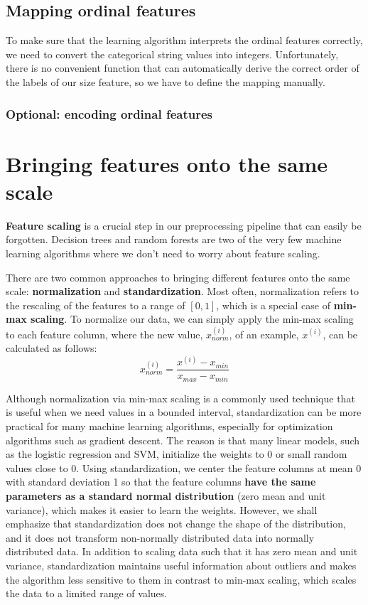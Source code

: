 \subsection{Mapping ordinal features}
To make sure that the learning algorithm interprets the ordinal features correctly, we need to convert the categorical string values into integers. Unfortunately, there is no convenient function that can automatically derive the correct order of the labels of our size feature, so we have to define the mapping manually.
\subsubsection*{Optional: encoding ordinal features}

\section{Bringing features onto the same scale}
\textbf{Feature scaling} is a crucial step in our preprocessing pipeline that can easily be forgotten. Decision trees and random forests are two of the very few machine learning algorithms where we don't need to worry about feature scaling.

There are two common approaches to bringing different features onto the same scale: \textbf{normalization} and \textbf{standardization}. Most often, normalization refers to the rescaling of the features to a range of $[0, 1]$, which is a special case of \textbf{min-max scaling}. To normalize our data, we can simply apply the min-max scaling to each feature column, where the new value, $x_{norm}^{(i)}$, of an example, $x^{(i)}$, can be calculated as follows:
\begin{equation}
    x_{norm}^{(i)}=\frac{x^{(i)}-x_{min}}{x_{max}-x_{min}}
\end{equation}

Although normalization via min-max scaling is a commonly used technique that is useful when we need values in a bounded interval, standardization can be more practical for many machine learning algorithms, especially for optimization algorithms such as gradient descent. The reason is that many linear models, such as the logistic regression and SVM, initialize the weights to 0 or small random values close to 0. Using standardization, we center the feature columns at mean 0 with standard deviation 1 so that the feature columns \textbf{have the same parameters as a standard normal distribution} (zero mean and unit variance), which makes it easier to learn the weights. However, we shall emphasize that standardization does not change the shape of the distribution, and it does not transform non-normally distributed data into normally distributed data. In addition to scaling data such that it has zero mean and unit variance, standardization maintains useful information about outliers and makes the algorithm less sensitive to them in contrast to min-max scaling, which scales the data to a limited range of values.

